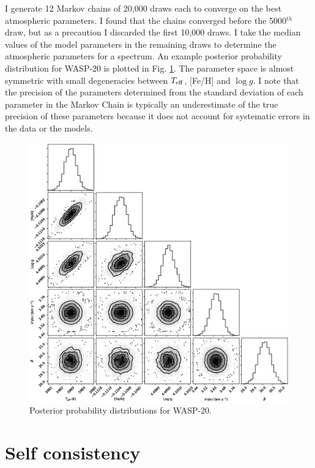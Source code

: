 I generate 12 Markov chains of 20,000 draws each to converge on the best atmospheric parameters. I found that the chains converged before the 5000$^{th}$ draw, but as a precaution I discarded the first 10,000 draws. I take the median values of the model parameters in the remaining draws to determine the atmospheric parameters for a spectrum. An example posterior probability distribution for WASP-20 is plotted in Fig. \ref{fig:wavelet:wavelet_corner_WASP20}. The parameter space is almost symmetric with small degeneracies between $T_{\rm eff}$, [Fe/H] and $\log g.$ I note that the precision of the parameters determined from the standard deviation of each parameter in the Markov Chain is typically an underestimate of the true precision of these parameters because it does not account for systematic errors in the data or the models.

\begin{figure}[ht!]
\centering
\includegraphics[width=\textwidth]{5-images/wavelet_WASP20_corner.eps}
\caption{Posterior probability distributions for WASP-20.}
\label{fig:wavelet:wavelet_corner_WASP20}
\end{figure}





\section{Self consistency}\label{wavelet:self_con}

